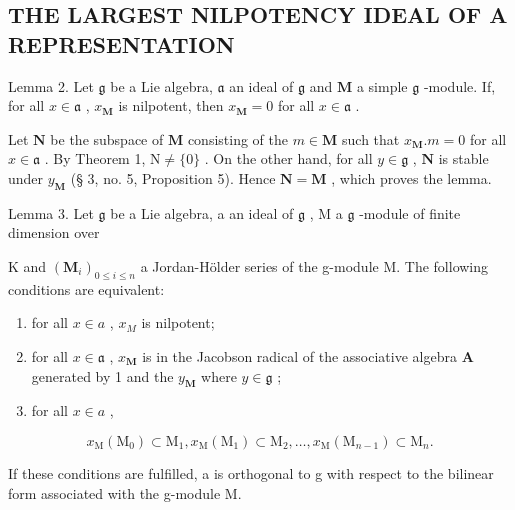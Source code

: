 \subsection{THE LARGEST NILPOTENCY IDEAL OF A REPRESENTATION}

Lemma 2. Let \(\mathfrak{g}\) be a Lie algebra, \(\mathfrak{a}\) an ideal of \(\mathfrak{g}\) and \(\mathbf{M}\) a simple \(\mathfrak{g}\) -module. If, for all \(x \in \mathfrak{a}\) , \(x_{\mathbf{M}}\) is nilpotent, then \(x_{\mathbf{M}} = 0\) for all \(x \in \mathfrak{a}\) .

Let \(\mathbf{N}\) be the subspace of \(\mathbf{M}\) consisting of the \(m \in \mathbf{M}\) such that \(x_{\mathbf{M}}.m = 0\) for all \(x \in \mathfrak{a}\) . By Theorem 1, \(\mathrm{N} \neq \{0\}\) . On the other hand, for all \(y \in \mathfrak{g}\) , \(\mathbf{N}\) is stable under \(y_{\mathbf{M}}\) (§ 3, no. 5, Proposition 5). Hence \(\mathbf{N} = \mathbf{M}\) , which proves the lemma.

Lemma 3. Let \(\mathfrak{g}\) be a Lie algebra, a an ideal of \(\mathfrak{g}\) , M a \(\mathfrak{g}\) -module of finite dimension over

K and \((\mathbf{M}_{i})_{0\leqslant i\leqslant n}\) a Jordan-Hölder series of the g-module M. The following conditions are equivalent:

\begin{enumerate}
\def\labelenumi{(\alph{enumi})}
\item
  for all \(x \in a\) , \(x_{M}\) is nilpotent;
\item
  for all \(x \in \mathfrak{a}\) , \(x_{\mathbf{M}}\) is in the Jacobson radical of the associative algebra \(\mathbf{A}\) generated by 1 and the \(y_{\mathbf{M}}\) where \(y \in \mathfrak{g}\) ;
\item
  for all \(x \in a\) ,
\end{enumerate}

\[
x _ {\mathrm{M}} \left(\mathrm{M} _ {0}\right) \subset \mathrm{M} _ {1}, x _ {\mathrm{M}} \left(\mathrm{M} _ {1}\right) \subset \mathrm{M} _ {2}, \dots , x _ {\mathrm{M}} \left(\mathrm{M} _ {n - 1}\right) \subset \mathrm{M} _ {n}.
\]

If these conditions are fulfilled, a is orthogonal to g with respect to the bilinear form associated with the g-module M.

